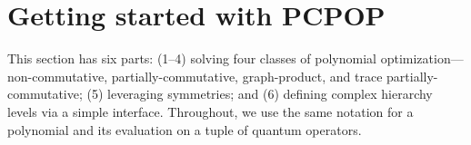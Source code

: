 \section{Getting started with PCPOP}
This section has six parts: (1–4) solving four classes of polynomial optimization—non-commutative, partially-commutative, graph-product, and trace partially-commutative; (5) leveraging symmetries; and (6) defining complex hierarchy levels via a simple interface. Throughout, we use the same notation for a polynomial and its evaluation on a tuple of quantum operators.





